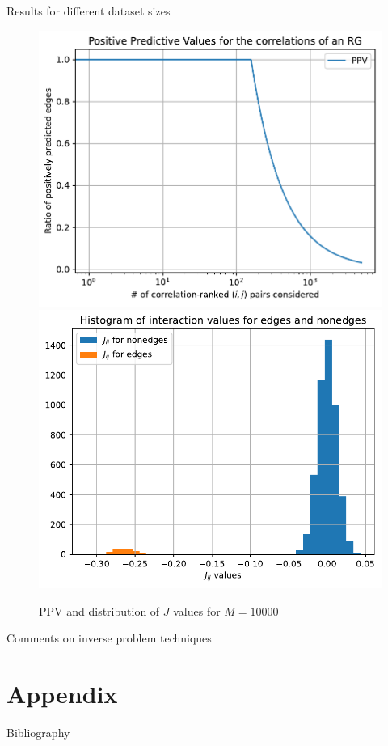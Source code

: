 \documentclass[handout]{beamer}
\begin{document}
\begin{frame}{Results for different dataset sizes}
    \begin{figure}
        \centering
        \includegraphics[width=.45\textwidth]{ppv_10k}
        \includegraphics[width=.45\textwidth]{nmf_jhist_10k}
        \caption{PPV and distribution of $J$ values for $M=10000$}
        \label{fig:nmf_10k}
    \end{figure}
\end{frame}

\begin{frame}{Comments on inverse problem techniques}
\end{frame}

\section{Appendix}

\begin{frame}[allowframebreaks]{Bibliography}
    \printbibliography
\end{frame}
\end{document}
